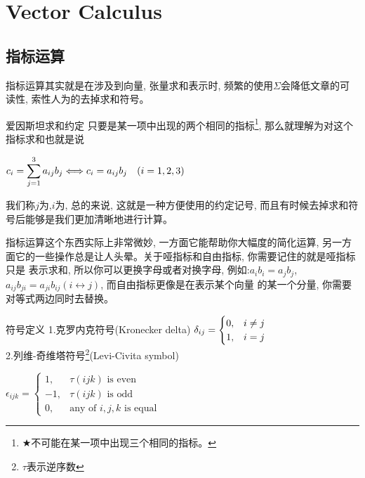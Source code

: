 
\appendix
\renewcommand{\thechapter}{\Alph{chapter}}
\chapter{Vector Calculus}
\section{指标运算}
指标运算其实就是在涉及到向量, 张量求和表示时, 频繁的使用$\Sigma$会降低文章的可读性, 索性人为的去掉求和符号。
\begin{proposition}{爱因斯坦求和约定}
    只要是某一项中出现的两个相同的指标\footnote{$\bigstar$不可能在某一项中出现三个相同的指标。}, 那么就理解为对这个指标求和也就是说
    \begin{center}
        \begin{math}
            \displaystyle
            c_i = \sum_{j=1}^{3}a_{ij}b_{j} \Longleftrightarrow c_i=a_{ij}b_{j} \text{\quad} (i=1,2,3)
        \end{math}
    \end{center}
    我们称$j$为,$i$为, 总的来说, 这就是一种方便使用的约定记号, 而且有时候去掉求和符号后能够是我们更加清晰地进行计算。
\end{proposition}
指标运算这个东西实际上非常微妙, 一方面它能帮助你大幅度的简化运算, 另一方面它的一些操作总是让人头晕。关于哑指标和自由指标, 你需要记住的就是哑指标只是
表示求和, 所以你可以更换字母或者对换字母, 例如:$a_ib_i=a_jb_j$, $a_{ij}b_{ji}=a_{ji}b_{ij}(i\leftrightarrow j)$, 而自由指标更像是在表示某个向量
的某一个分量, 你需要对等式两边同时去替换。
\begin{define}{符号定义}
    1.克罗内克符号(Kronecker delta)\qquad\qquad
    \begin{math}
        \centering
        \delta_{ij}=\begin{cases}
            0,& i \neq j\\
            1,& i=j
        \end{cases}
    \end{math}\\
    2.列维-奇维塔符号\footnote{$\tau$表示逆序数}(Levi-Civita symbol)\\
    \begin{center}
    \begin{math}
        \epsilon_{ijk}=\begin{cases}
            1,&\tau(ijk)\text{ is even}\\
            -1,&\tau(ijk)\text{ is odd}\\
            0,&\text{any of $i,j,k$ is equal}
        \end{cases}
    \end{math} 
    \end{center}
\end{define}    
